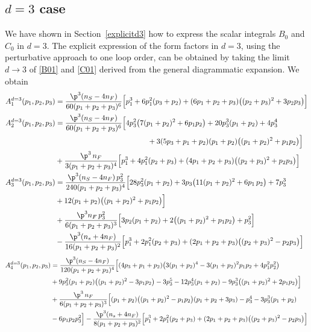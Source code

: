 \documentclass[a4paper,11pt,openright,twoside]{book}
\newcommand{\secref}[1]{Section~\ref{#1}}		%
\numberwithin{equation}{section}
\begin{document}
{{\subsection{$d=3$ case}
We have shown in \secref{explicitd3} how to express the scalar integrals ${B}_0$ and ${C}_0$ in $d=3$.  
The explicit expression of the form factors in $d=3$, using the perturbative approach to one loop order, can be obtained by taking the limit $d\to3$ of \eqref{B01} and \eqref{C01} derived from the general diagrammatic expansion. We obtain
\begin{align}
	A_{1}^{d=3}(p_1,p_2,p_3)&=\frac{\p^3(n_S-4n_F)}{60(p_1+p_2+p_3)^6}\Big[p_1^3+6p_1^2(p_3+p_2)+(6p_1+p_2+p_3)\big((p_2+p_3)^2+3 p_2 p_3\big)\Big]\\
	A_{2}^{d=3}(p_1,p_2,p_3)&=\frac{\p^3(n_S-4n_F)}{60(p_1+p_2+p_3)^6}\Big[4p_3^2\big(7(p_1+p_2)^2+6p_1 p_2\big)+20p_3^3(p_1+p_2)+4p_3^4\notag\\
	&\hspace{4.4cm}+3(5p_3+p_1+p_2)(p_1+p_2)\big((p_1+p_2)^2+p_1 p_2\big)\Big]\notag\\
	&+\frac{\p^3\,n_F}{3(p_1+p_2+p_3)^4}\Big[p_1^3+4p_1^2(p_2+p_3)+(4p_1+p_2+p_3)\big((p_2+p_3)^2+p_2 p_3\big)\Big]\\
	A_{3}^{d=3}(p_1,p_2,p_3)&=\frac{\p^3(n_S-4n_F)\,p_3^2}{240(p_1+p_2+p_3)^4}\Big[28p_3^2(p_1+p_2)+3p_3\big(11(p_1+p_2)^2+6 p_1\,p_2\big)+7p_3^3\notag\\
	&+12(p_1+p_2)\big((p_1+p_2)^2+p_1p_2\big)\Big]\notag\\
	&+\frac{\p^3n_F\,p_3^2}{6(p_1+p_2+p_3)^3}\Big[3p_2(p_1+p_2)+2\big((p_1+p_2)^2+p_1p_2\big)+p_3^2\Big]\notag\\
	&-\frac{\p^3(n_s+4n_F)}{16(p_1+p_2+p_3)^2}\Big[p_1^3+2p_1^2(p_2+p_3)+(2p_1+p_2+p_3)\big((p_2+p_3)^2-p_2 p_3\big)\Big]
\end{align}
\begin{align}
	A_{4}^{d=3}(p_1,p_2,p_3)&=\frac{\p^3(n_S-4n_F)}{120(p_1+p_2+p_3)^4}\Big[(4p_3+p_1+p_2)\big(3(p_1+p_2)^4-3(p_1+p_2)^2p_1p_2+4p_1^2p_2^2\big)\notag\\
	&+9p_3^2(p_1+p_2)\big((p_1+p_2)^2-3p_1 p_2\big)-3p_3^5-12p_3^4(p_1+p_2)-9p_3^3\big((p_1+p_2)^2+2p_1 p_2\big)\Big]\notag\\
	&+\frac{\p^3\,n_F}{6(p_1+p_2+p_3)^3}\Big[(p_1+p_2)\big((p_1+p_2)^2-p_1 p_2\big)(p_1+p_2+3p_3)-p_3^4-3p_3^3(p_1+p_2)\notag\\
	&-6p_1p_2p_3^2\Big]-\frac{\p^3(n_s+4n_F)}{8(p_1+p_2+p_3)^2}\Big[p_1^3+2p_1^2(p_2+p_3)+(2p_1+p_2+p_3)\big((p_2+p_3)^2-p_2 p_3\big)\Big]\\

\end{align}}}
\end{document}
